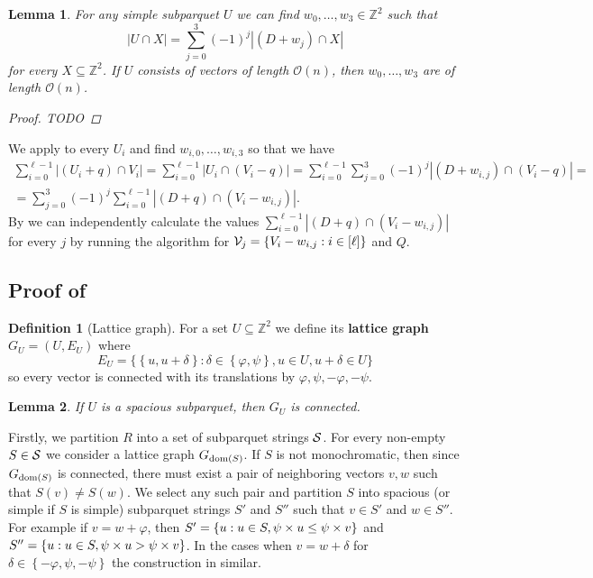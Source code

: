 \documentclass[11pt]{article}
\newcommand{\Z}{\mathbb{Z}}
\renewcommand{\O}{\mathcal{O}}
\renewcommand{\phi}{\varphi}
\newcommand{\set}[1]{\left\lbrace #1 \right\rbrace}
\newcommand{\bigset}[1]{\big \lbrace #1 \big \rbrace}
\newcommand{\eq}[1]{\begin{align*} #1 \end{align*}}
\theoremstyle{plain}
\newtheorem{lemma}{Lemma}
\theoremstyle{definition}
\newtheorem{definition}{Definition}
\theoremstyle{remark}
\begin{document}
\begin{lemma}\label{primitive}
	For any simple subparquet $U$ we can find $w_0, \dots, w_3 \in \Z^2$ such that
	$$ |U \cap X| = \sum_{j = 0}^3 (-1)^j |(D + w_j) \cap X|$$
	for every $X \subseteq \Z^2$.
	If $U$ consists of vectors of length $\O(n)$, then $w_0, \dots, w_3$ are of length $\O(n)$.
	\begin{proof}
		TODO
	\end{proof}
\end{lemma}

We apply  to every $U_i$ and find $w_{i, 0}, \dots, w_{i, 3}$ so that we have
\eq{
	\sum_{i = 0}^{\ell - 1}|(U_i + q) \cap V_i| 
= \sum_{i = 0}^{\ell - 1}|U_i \cap (V_i - q)| 
= \sum_{i = 0}^{\ell - 1} \sum_{j = 0}^3 (-1)^j |(D + w_{i, j}) \cap (V_i - q)| = \\
= \sum_{j = 0}^3 (-1)^j \sum_{i = 0}^{\ell - 1} |(D + q) \cap (V_i - w_{i, j})|.
}
By  we can independently calculate the values $\sum_{i = 0}^{\ell - 1} |(D + q) \cap (V_i - w_{i, j})|$ for every $j$ by running the algorithm for $\V_j = \set{V_i - w_{i, j} : i \in [\ell]}$ and $Q$.


\subsection{Proof of } \label{parquet_decomposition_proof}


\begin{definition}[Lattice graph]
	For a set $U \subseteq \Z^2$ we define its \textbf{lattice graph} $G_U = (U, E_U)$ where
	$$ E_U = \bigset{\set{u, u + \delta} : \delta \in \set{\phi, \psi}, u \in U, u + \delta \in U} $$ 
	so every vector is connected with its translations by $\phi, \psi, -\phi, -\psi$.
\end{definition}


\begin{lemma}
	If $U$ is a spacious subparquet, then $G_U$ is connected.
\end{lemma}


Firstly, we partition $R$ into a set of subparquet strings $\S$.
For every non-empty $S \in \S$ we consider a lattice graph $G_{\d{S}}$. If $S$ is not monochromatic, then since $G_{\d{S}}$ is connected, there must exist a pair of neighboring vectors $v, w$ such that $S(v) \neq S(w)$.
We select any such pair and partition $S$ into spacious (or simple if $S$ is simple) subparquet strings $S'$ and $S''$ such that $v \in S'$ and $w \in S''$.
For example if $v = w + \phi$, then $S' = \set{u : u \in S, \s{u} \le \s{v}}$ and $S'' = \set{u : u \in S, \s{u} > \s{v}}$.
In the cases when $v = w + \delta$ for $\delta \in \set{-\phi, \psi, -\psi}$ the construction in similar.
\end{document}

